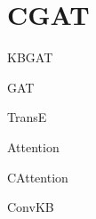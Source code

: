 \section{CGAT}


KBGAT \cite{nathani2019learning}

GAT \cite{velivckovic2017graph}

TransE \cite{bordes2013translating}

Attention \cite{vaswani2017attention}

CAttention \cite{cordonnier2020multi}

ConvKB \cite{nguyen2017novel}

